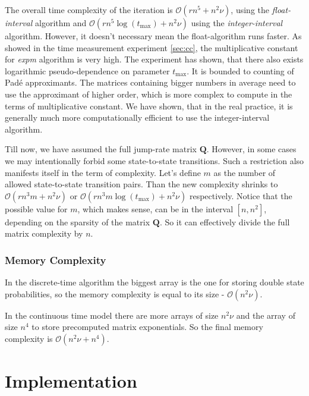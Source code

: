 \documentclass[thesis=M,english]{FITthesis}[2012/10/20]
\newcommand{\matr}[1]{\mathbf{#1}}
\begin{document}
\begin{itemize}
\begin{itemize}
\end{itemize}   

The overall time complexity of the iteration is $\mathcal{O}( r n^5 + n^2\nu )$, using the \textit{float-interval} algorithm and $\mathcal{O}( r n^5\log(t_{\max}) + n^2\nu )$ using the \textit{integer-interval} algorithm. However, it doesn't necessary mean the float-algorithm runs faster. As showed in the time measurement experiment \ref{sec:cc}, the multiplicative constant for \textit{expm} algorithm is very high. The experiment has shown, that there also exists logarithmic pseudo-dependence on parameter $t_{\max}$. It is bounded to counting of Pad\'{e} approximants. The matrices containing bigger numbers in average need to use the approximant of higher order, which is more complex to compute in the terms of multiplicative constant. We have shown, that in the real practice, it is generally much more computationally efficient to use the integer-interval algorithm.

Till now, we have assumed the full jump-rate matrix $\matr{Q}$. However, in some cases we may intentionally forbid some state-to-state transitions. Such a restriction also manifests itself in the term of complexity. Let's define $m$ as the number of allowed state-to-state transition pairs. Than the new complexity shrinks to $\mathcal{O}( r n^3 m + n^2\nu )$ or $\mathcal{O}( r n^3 m \log(t_{\max}) + n^2\nu )$ respectively. Notice that the possible value for $m$, which makes sense, can be in the interval $[n,n^2]$, depending on the sparsity of the matrix $\matr{Q}$. So it can effectively divide the full matrix complexity by $n$.  

\end{itemize}

\subsection{Memory Complexity}
In the discrete-time algorithm the biggest array is the one for storing double state probabilities, so the memory complexity is equal to its size - $\mathcal{O}(n^2\nu)$. 

In the continuous time model there are more arrays of size $n^2\nu$ and the array of size $n^4$ to store precomputed matrix exponentials. So the final memory complexity is $\mathcal{O}( n^2\nu + n^4 )$.

\chapter{Implementation}
\end{document}
